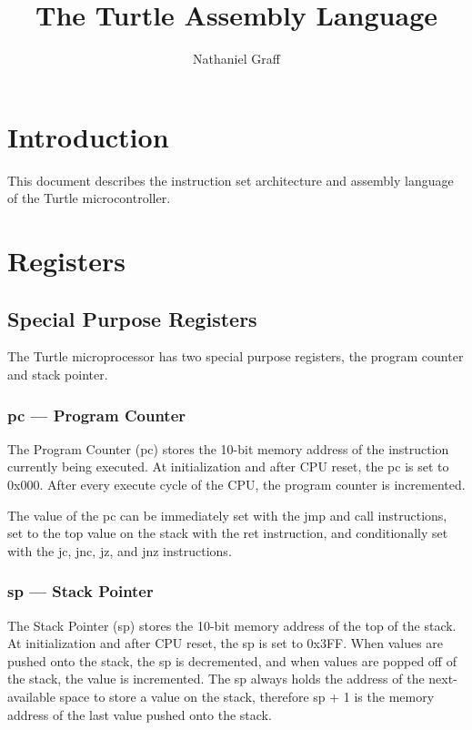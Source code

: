 \documentclass[titlepage]{article}
\title{The Turtle Assembly Language}
\author{Nathaniel Graff}
\date{ }
\begin{document}
\maketitle

\tableofcontents

\newpage

\section{Introduction}
This document describes the instruction set architecture and assembly language of the Turtle microcontroller.

\section{Registers}

\subsection{Special Purpose Registers}

The Turtle microprocessor has two special purpose registers, the program counter and stack pointer.

\subsubsection{pc --- Program Counter}

The Program Counter (pc) stores the 10-bit memory address of the instruction currently being executed. At initialization and after CPU reset, the pc is set to 0x000. After every execute cycle of the CPU, the program counter is incremented.

The value of the pc can be immediately set with the jmp and call instructions, set to the top value on the stack with the ret instruction, and conditionally set with the jc, jnc, jz, and jnz instructions.

\subsubsection{sp --- Stack Pointer}

The Stack Pointer (sp) stores the 10-bit memory address of the top of the stack. At initialization and after CPU reset, the sp is set to 0x3FF. When values are pushed onto the stack, the sp is decremented, and when values are popped off of the stack, the value is incremented. The sp always holds the address of the next-available space to store a value on the stack, therefore sp + 1 is the memory address of the last value pushed onto the stack.
\end{document}
